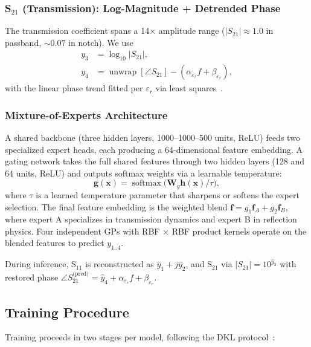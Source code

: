 \documentclass[conference]{IEEEtran}
\begin{document}
\subsubsection{S$_{21}$ (Transmission): Log-Magnitude + Detrended Phase}
The transmission coefficient spans a 14$\times$ amplitude range ($|S_{21}| \approx 1.0$ in passband, $\sim 0.07$ in notch). We use
\begin{align}
y_3 &= \log_{10} |S_{21}|, \label{eq:s21log}\\
y_4 &= \operatorname{unwrap}\left[\angle S_{21}\right] - (\alpha_{\varepsilon_r} f + \beta_{\varepsilon_r}), \label{eq:s21phase}
\end{align}
with the linear phase trend fitted per $\varepsilon_r$ via least squares~\cite{kay1998fundamentals}.

\subsubsection{Mixture-of-Experts Architecture}
A shared backbone (three hidden layers, 1000--1000--500 units, ReLU) feeds two specialized expert heads, each producing a 64-dimensional feature embedding. A gating network takes the full shared features through two hidden layers (128 and 64 units, ReLU) and outputs softmax weights via a learnable temperature:
\begin{equation}
\mathbf{g}(\mathbf{x}) = \operatorname{softmax}\bigl(\mathbf{W}_g \mathbf{h}(\mathbf{x}) / \tau\bigr),
\end{equation}
where $\tau$ is a learned temperature parameter that sharpens or softens the expert selection. The final feature embedding is the weighted blend $\mathbf{f} = g_1 \mathbf{f}_A + g_2 \mathbf{f}_B$, where expert A specializes in transmission dynamics and expert B in reflection physics. Four independent GPs with RBF $\times$ RBF product kernels operate on the blended features to predict $y_{1..4}$.

During inference, S$_{11}$ is reconstructed as $\hat{y}_1 + j\hat{y}_2$, and S$_{21}$ via $|S_{21}| = 10^{\hat{y}_3}$ with restored phase $\angle S_{21}^{\text{(pred)}} = \hat{y}_4 + \alpha_{\varepsilon_r} f + \beta_{\varepsilon_r}$.


\subsection{Training Procedure}

Training proceeds in two stages per model, following the DKL protocol~\cite{wilson2016deep}:
\end{document}
